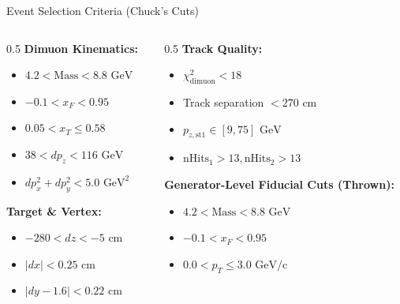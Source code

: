 \documentclass[aspectratio=169]{beamer}
\begin{document}
\begin{frame}{Event Selection Criteria (Chuck's Cuts)}
    \begin{columns}[T]
        \begin{column}{0.5\textwidth}
            \textbf{Dimuon Kinematics:}
            \begin{itemize}
                \item $4.2 < \text{Mass} < 8.8 \text{ GeV}$
                \item $-0.1 < x_F < 0.95$
                \item $0.05 < x_T \leq 0.58$
                \item $38 < dp_z < 116 \text{ GeV}$
                \item $dp_x^2 + dp_y^2 < 5.0 \text{ GeV}^2$
            \end{itemize}
            \vspace{0.2cm}
            \textbf{Target \& Vertex:}
            \begin{itemize}
                \item $-280 < dz < -5 \text{ cm}$
                \item $|dx| < 0.25 \text{ cm}$
                \item $|dy - 1.6| < 0.22 \text{ cm}$
            \end{itemize}
        \end{column}
        
        \begin{column}{0.5\textwidth}
            \textbf{Track Quality:}
            \begin{itemize}
                \item $\chi^2_{\text{dimuon}} < 18$
                \item Track separation $< 270 \text{ cm}$
                \item $p_{z,\text{st1}} \in [9, 75] \text{ GeV}$
                \item $\text{nHits}_1 > 13, \text{nHits}_2 > 13$
            \end{itemize}
            \vspace{0.2cm}
            \textbf{Generator-Level Fiducial Cuts (Thrown):}
            \begin{itemize}
                \item $4.2 < \text{Mass} < 8.8 \text{ GeV}$
                \item $-0.1 < x_F < 0.95$
                \item $0.0 < p_T \leq 3.0 \text{ GeV/c}$
            \end{itemize}
        \end{column}
    \end{columns}
\end{frame}
\end{document}
